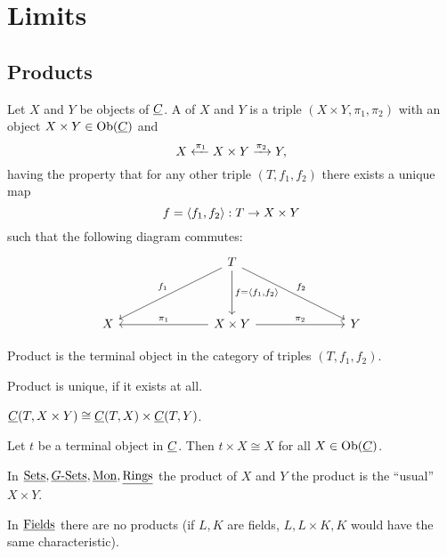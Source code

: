 \chapter{Limits}

\section{Products}

\begin{definition*}
	Let \( X \) and \( Y \) be objects of \( \underline{C} \). A  of \( X \) and \( Y \) is a triple \( (X \times Y, \pi_1, \pi_2) \) with an object \( X \times Y \in \operatorname{Ob}(\underline{C}) \) and 
	\[
		X \xleftarrow{\pi_1} X \times Y \xrightarrow{\pi_2} Y,
	\]
	having the property that for any other triple \( (T, f_1, f_2) \) there exists a unique map
	\[
		f = \langle f_1, f_2 \rangle: T \to X \times Y
	\]
	such that the following diagram commutes:
	\[
		\begin{tikzcd}
			&&& T \\
			\\
			X &&& {X \times Y} &&& Y
			\arrow["{f_1}"', from=1-4, to=3-1]
			\arrow["{f = \langle f_1, f_2\rangle}", from=1-4, to=3-4]
			\arrow["{f_2}", from=1-4, to=3-7]
			\arrow["{\pi_1}"', from=3-4, to=3-1]
			\arrow["{\pi_2}", from=3-4, to=3-7]
		\end{tikzcd}
	\]
\end{definition*}

\begin{remarks*}
	\item Product is the terminal object in the category of triples \( (T, f_1, f_2) \).
	\item Product is unique, if it exists at all.
	\item \( \underline{C}(T, X \times Y) \cong \underline{C}(T, X) \times \underline{C}(T, Y) \).
	\item Let \( t \) be a terminal object in \( \underline{C} \). Then \( t \times X \cong X \) for all \( X \in \operatorname{Ob}(\underline{C}) \).
\end{remarks*}

\begin{examples*}
	\item In \( \underline{\mathrm{Sets}}, \underline{G\text{-}\mathrm{Sets}}, \underline{\mathrm{Mon}}, \underline{\mathrm{Rings}} \) the product of \( X \) and \( Y \) the product is the \enquote{usual} \( X \times Y \).
	\item In \( \underline{\mathrm{Fields}} \) there are no products (if \( L, K \) are fields, \( L, L \times K, K \) would have the same characteristic).
\end{examples*}

